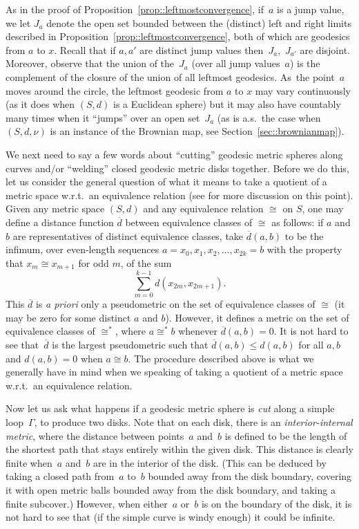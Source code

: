 \documentclass[JEP,XML,SOM,Unicode]{cedram}
\theoremstyle{plain}
\numberwithin{theorem}{section}
\theoremstyle{definition}
\let\ol\overline
\begin{document}
As in the proof of Proposition~\ref{prop::leftmostconvergence}, if~$a$ is a jump value, we let $J_a$ denote the open set bounded between the (distinct) left and right limits described in Proposition~\ref{prop::leftmostconvergence}, both of which are geodesics from $a$ to $x$. Recall that if $a,a'$ are distinct jump values then~$J_a$,~$J_{a'}$ are disjoint. Moreover, observe that the union of the~$J_a$ (over all jump values~$a$) is the complement of the closure of the union of all leftmost geodesics. As~the point~$a$ moves around the circle, the leftmost geodesic from $a$ to $x$ may vary continuously (as it does when $(S,d)$ is a Euclidean sphere) but it may also have countably many times when it ``jumps'' over an open set~$J_a$ (as is a.s.\ the case when $(S,d, \nu)$ is an instance of the Brownian map, see Section~\ref{sec::brownianmap}).\enlargethispage{.5\baselineskip}%

We next need to say a few words about ``cutting'' geodesic metric spheres along curves and/or ``welding'' closed geodesic metric disks together. Before we do this, let us consider the general question of what it means to take a quotient of a metric space w.r.t.\ an equivalence relation (see \cite[Chap.\,3]{courseinmetricgeometry} for more discussion on this point). Given any metric space $(S,d)$ and any equivalence relation $\cong$ on $S$, one may define a distance function $\ol{d}$ between equivalence classes of $\cong$ as follows: if $a$ and $b$ are representatives of distinct equivalence classes, take $\ol{d}(a,b)$ to be the infimum, over even-length sequences $a = x_0, x_1, x_2, \ldots, x_{2k} = b$ with the property that $x_m \cong x_{m+1}$ for odd $m$, of the sum\vspace*{-3pt}
\[
\sum_{m=0}^{k-1} d(x_{2m}, x_{2m+1}).
\]
This $\ol{d}$ is \emph{a priori} only a pseudometric on the set of equivalence classes of $\cong$ (\ie it may be zero for some distinct $a$ and $b$). However, it defines a metric on the set of equivalence classes of $\cong^*$, where $a \cong^* b$ whenever $\ol{d}(a,b) = 0$. It is not hard to see that~$\ol{d}$ is the largest pseudometric such that $\ol{d}(a,b) \leq d(a,b)$ for all $a,b$ and $d(a,b) = 0$ when $a \cong b$. The procedure described above is what we generally have in mind when we speaking of taking a quotient of a metric space w.r.t.\ an equivalence relation.

Now let us ask what happens if a geodesic metric sphere is \emph{cut} along a simple loop~$\Gamma$, to produce two disks. Note that on each disk, there is an \emph{interior-internal metric}, where the distance between points~$a$ and~$b$ is defined to be the length of the shortest path that stays entirely within the given disk. This distance is clearly finite when~$a$ and~$b$ are in the interior of the disk. (This can be deduced by taking a closed path from~$a$ to~$b$ bounded away from the disk boundary, covering it with open metric balls bounded away from the disk boundary, and taking a finite subcover.) However, when either~$a$ or~$b$ is on the boundary of the disk, it is not hard to see that (if the simple curve is windy enough) it could be infinite.
\end{document}
